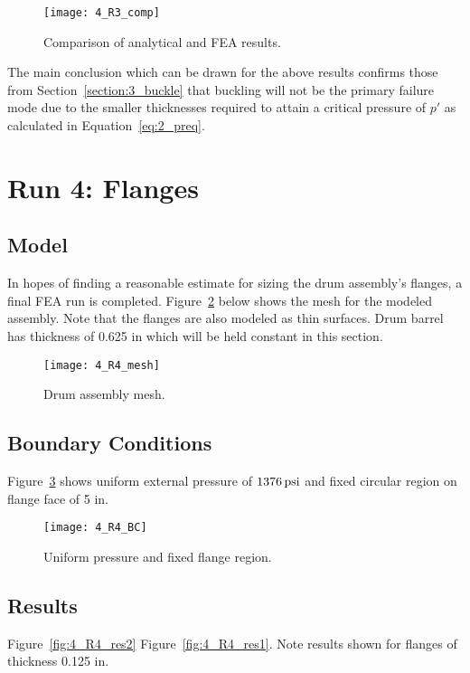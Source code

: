 \begin{figure}[H]
	\centering
	\texttt{[image: 4\_R3\_comp]}
	\caption{Comparison of analytical and FEA results.}
	\label{fig:4_R3_comp}
\end{figure}


The main conclusion which can be drawn for the above results confirms those from Section~\ref{section:3_buckle} that buckling will not be the primary failure mode due to the smaller thicknesses required to attain a critical pressure of $p'$ as calculated in Equation~\ref{eq:2_preq}.

\section{Run 4: Flanges}
\label{section:4_R4}
\subsection{Model}

In hopes of finding a reasonable estimate for sizing the drum assembly's flanges, a final FEA run is completed. Figure~\ref{fig:4_R4_mesh} below shows the mesh for the modeled assembly. Note that the flanges are also modeled as thin surfaces. Drum barrel has thickness of 0.625 in which will be held constant in this section.
\begin{figure}[H]
	\centering
	\texttt{[image: 4\_R4\_mesh]}
	\caption{Drum assembly mesh.}
	\label{fig:4_R4_mesh}
\end{figure}

\subsection{Boundary Conditions}

Figure~\ref{fig:4_R4_BC} shows uniform external pressure of $1376 \,\mathrm{psi}$ and fixed circular region on flange face of 5 in.
\begin{figure}[H]
	\centering
	\texttt{[image: 4\_R4\_BC]}
	\caption{Uniform pressure and fixed flange region.}
	\label{fig:4_R4_BC}
\end{figure}


\subsection{Results}

Figure~\ref{fig:4_R4_res2} Figure~\ref{fig:4_R4_res1}. Note results shown for flanges of thickness 0.125 in.

